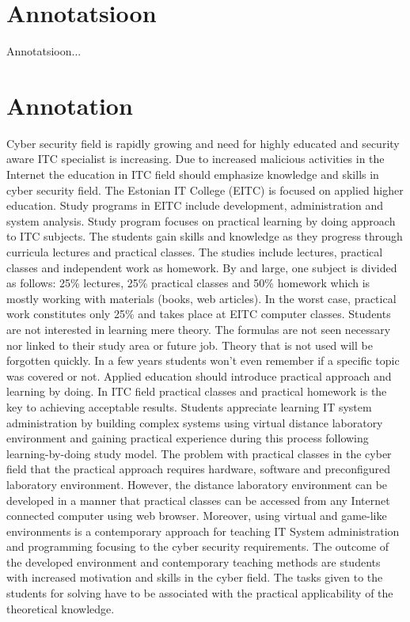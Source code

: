 \clearpage
\chapter*{Annotatsioon}
\label{annotatsioon}
\thispagestyle{empty}
Annotatsioon...


\clearpage
\chapter*{Annotation}
\label{annotation}
\thispagestyle{empty}

Cyber security field is rapidly growing and need for highly educated and security aware ITC specialist is increasing. Due to increased malicious activities in the Internet the education in ITC field should emphasize knowledge and skills in cyber security field.
The Estonian IT College (EITC) is focused on applied higher education. Study programs in EITC include development, administration and system analysis. Study program focuses on practical learning by doing approach to ITC subjects. The students gain skills and knowledge as they progress through curricula lectures and practical classes. The studies include lectures, practical classes and independent work as homework. By and large, one subject is divided as follows: 25\% lectures, 25\% practical classes and 50\% homework which is mostly working with materials (books, web articles). In the worst case, practical work constitutes only 25\% and takes place at EITC computer classes. Students are not interested in learning mere theory. The formulas are not seen necessary nor linked to their study area or future job. Theory that is not used will be forgotten quickly. In a few years students won't even remember if a specific topic was covered or not. Applied education should introduce practical approach and learning by doing. In ITC field practical classes and practical homework is the key to achieving acceptable results. Students appreciate learning IT system administration by building complex systems using virtual distance laboratory environment and gaining practical experience during this process following learning-by-doing study model.
The problem with practical classes in the cyber field that the practical approach requires hardware, software and preconfigured laboratory environment. However, the  distance laboratory environment can be developed in a manner  that practical classes can be accessed from any Internet connected computer using web browser. Moreover, using virtual and game-like environments is a contemporary approach for teaching IT System administration and programming focusing to the cyber security requirements. The outcome of the developed environment and contemporary teaching methods are students with increased motivation and skills in the cyber field. The tasks given to the students for solving have to be associated with the practical applicability of the theoretical knowledge.

